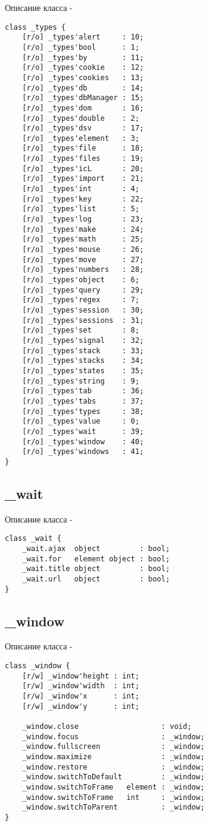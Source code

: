 \noindent Описание класса  -
\begin{lstlisting}[numbers=none]
class _types {
	[r/o] _types'alert     : 10;
	[r/o] _types'bool      : 1;
	[r/o] _types'by        : 11;
	[r/o] _types'cookie    : 12;
	[r/o] _types'cookies   : 13;
	[r/o] _types'db        : 14;
	[r/o] _types'dbManager : 15;
	[r/o] _types'dom       : 16;
	[r/o] _types'double    : 2;
	[r/o] _types'dsv       : 17;
	[r/o] _types'element   : 3;
	[r/o] _types'file      : 18;
	[r/o] _types'files     : 19;
	[r/o] _types'icL       : 20;
	[r/o] _types'import    : 21;
	[r/o] _types'int       : 4;
	[r/o] _types'key       : 22;
	[r/o] _types'list      : 5;
	[r/o] _types'log       : 23;
	[r/o] _types'make      : 24;
	[r/o] _types'math      : 25;
	[r/o] _types'mouse     : 26;
	[r/o] _types'move      : 27;
	[r/o] _types'numbers   : 28;
	[r/o] _types'object    : 6;
	[r/o] _types'query     : 29;
	[r/o] _types'regex     : 7;
	[r/o] _types'session   : 30;
	[r/o] _types'sessions  : 31;
	[r/o] _types'set       : 8;
	[r/o] _types'signal    : 32;
	[r/o] _types'stack     : 33;
	[r/o] _types'stacks    : 34;
	[r/o] _types'states    : 35;
	[r/o] _types'string    : 9;
	[r/o] _types'tab       : 36;
	[r/o] _types'tabs      : 37;
	[r/o] _types'types     : 38;
	[r/o] _types'value     : 0;
	[r/o] _types'wait      : 39;
	[r/o] _types'window    : 40;
	[r/o] _types'windows   : 41;
}
\end{lstlisting}

\subsection{{\color{orange} \_wait}}

\noindent Описание класса  -
\begin{lstlisting}[numbers=none]
class _wait {
	_wait.ajax  object         : bool;
	_wait.for   element object : bool;
	_wait.title object         : bool;
	_wait.url   object         : bool;
}
\end{lstlisting}

\subsection{{\color{orange} \_window}}

\noindent Описание класса  -
\begin{lstlisting}[numbers=none]
class _window {
	[r/w] _window'height : int;
	[r/w] _window'width  : int;
	[r/w] _window'x      : int;
	[r/w] _window'y      : int;
	
	_window.close                   : void;
	_window.focus                   : _window;
	_window.fullscreen              : _window;
	_window.maximize                : _window;
	_window.restore                 : _window;
	_window.switchToDefault         : _window;
	_window.switchToFrame   element : _window;
	_window.switchToFrame   int     : _window;
	_window.switchToParent          : _window;
}
\end{lstlisting}

